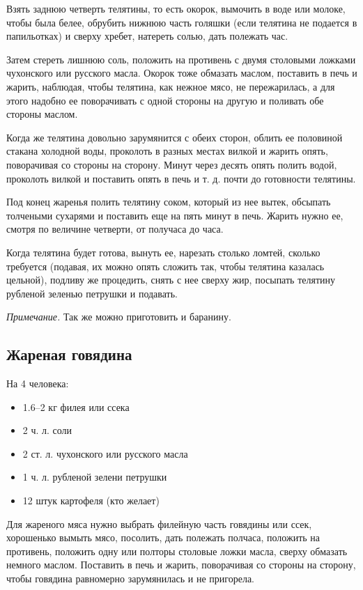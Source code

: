 Взять заднюю четверть телятины, то есть окорок, вымочить в воде или молоке, чтобы была белее, обрубить нижнюю часть голяшки (если телятина не подается в папильотках) и сверху хребет, натереть солью, дать полежать час.

Затем стереть лишнюю соль, положить на противень с двумя столовыми ложками чухонского или русского масла. Окорок тоже обмазать маслом, поставить в печь и жарить, наблюдая, чтобы телятина, как нежное мясо, не пережарилась, а для этого надобно ее поворачивать с одной стороны на другую и поливать обе стороны маслом.

Когда же телятина довольно зарумянится с обеих сторон, облить ее половиной стакана холодной воды, проколоть в разных местах вилкой и жарить опять, поворачивая со стороны на сторону. Минут через десять опять полить водой, проколоть вилкой и поставить опять в печь и т. д. почти до готовности телятины.

Под конец жаренья полить телятину соком, который из нее вытек, обсыпать толчеными сухарями и поставить еще на пять минут в печь. Жарить нужно ее, смотря по величине четверти, от получаса до часа.

Когда телятина будет готова, вынуть ее, нарезать столько ломтей, сколько требуется (подавая, их можно опять сложить так, чтобы телятина казалась цельной), подливу же процедить, снять с нее сверху жир, посыпать телятину рубленой зеленью петрушки и подавать.

\emph{Примечание.} Так же можно приготовить и баранину.

\subsection{Жареная говядина}\label{2zhar-goviad}

 На 4 человека: 

\begin{itemize}
	\item 1.6–2 кг филея или ссека 
    \item 2 ч. л. соли 
    \item 2 ст. л. чухонского или русского масла 
    \item 1 ч. л. рубленой зелени петрушки 
    \item 12 штук картофеля (кто желает)
\end{itemize}

Для жареного мяса нужно выбрать филейную часть говядины или ссек, хорошенько вымыть мясо, посолить, дать полежать полчаса, положить на противень, положить одну или полторы столовые ложки масла, сверху обмазать немного маслом. Поставить в печь и жарить, поворачивая со стороны на сторону, чтобы говядина равномерно зарумянилась и не пригорела.

